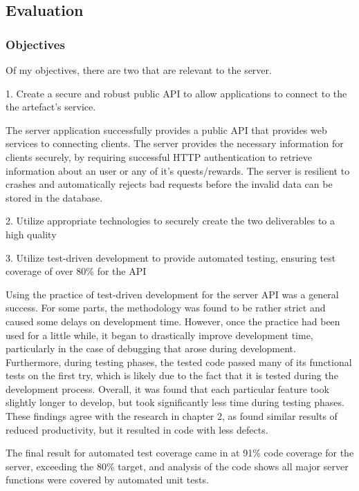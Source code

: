 \subsection{Evaluation}

\subsubsection{Objectives}
Of my objectives, there are two that are relevant to the server.

1. Create a secure and robust public API to allow applications to connect to the the artefact's service.

The server application successfully provides a public API that provides web services to connecting clients.
The server provides the necessary information for clients securely, by requiring successful HTTP authentication to retrieve information about an user or any of it's quests/rewards.
The server is resilient to crashes and automatically rejects bad requests before the invalid data can be stored in the database.

2. Utilize appropriate technologies to securely create the two deliverables to a high quality



3. Utilize test-driven development to provide automated testing, ensuring test coverage of over 80\% for the API

Using the practice of test-driven development for the server API was a general success. 
For some parts, the methodology was found to be rather strict and caused some delays on development time.
However, once the practice had been used for a little while, it began to drastically improve development time, particularly in the case of debugging that arose during development.
Furthermore, during testing phases, the tested code passed many of its functional tests on the first try, which is likely due to the fact that it is tested during the development process.
Overall, it was found that each particular feature took slightly longer to develop, but took significantly less time during testing phases.
These findings agree with the research in chapter 2, as \cite{IBMTDD} found similar results of reduced productivity, but it resulted in code with less defects.

The final result for automated test coverage came in at 91\% code coverage for the server, exceeding the 80\% target, and analysis of the code shows all major server functions were covered by automated unit tests.

